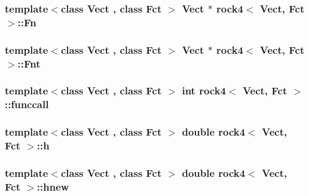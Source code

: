 \hypertarget{classrock4_a98e77f7c93220f078b4a7b4e7f861cc0}{
\subsubsection[{Fn}]{\setlength{\rightskip}{0pt plus 5cm}template$<$class Vect , class Fct $>$ Vect $\ast$ {\bf rock4}$<$ Vect, Fct $>$\-::Fn\hspace{0.3cm}{\ttfamily [private]}}}\label{classrock4_a98e77f7c93220f078b4a7b4e7f861cc0}
\hypertarget{classrock4_ac350c132515ab318ab0478b00321febe}{
\subsubsection[{Fnt}]{\setlength{\rightskip}{0pt plus 5cm}template$<$class Vect , class Fct $>$ Vect $\ast$ {\bf rock4}$<$ Vect, Fct $>$\-::Fnt\hspace{0.3cm}{\ttfamily [private]}}}\label{classrock4_ac350c132515ab318ab0478b00321febe}
\hypertarget{classrock4_a8f6165ff91a4e3fe6722cfe60231f968}{
\subsubsection[{funccall}]{\setlength{\rightskip}{0pt plus 5cm}template$<$class Vect , class Fct $>$ int {\bf rock4}$<$ Vect, Fct $>$\-::funccall\hspace{0.3cm}{\ttfamily [private]}}}\label{classrock4_a8f6165ff91a4e3fe6722cfe60231f968}
\hypertarget{classrock4_a6f524670ac0a00ad38e3cbdef112b849}{
\subsubsection[{h}]{\setlength{\rightskip}{0pt plus 5cm}template$<$class Vect , class Fct $>$ double {\bf rock4}$<$ Vect, Fct $>$\-::h\hspace{0.3cm}{\ttfamily [private]}}}\label{classrock4_a6f524670ac0a00ad38e3cbdef112b849}
\hypertarget{classrock4_a2cb273ca88d7568a5bc7a6cf5c988564}{
\subsubsection[{hnew}]{\setlength{\rightskip}{0pt plus 5cm}template$<$class Vect , class Fct $>$ double {\bf rock4}$<$ Vect, Fct $>$\-::hnew\hspace{0.3cm}{\ttfamily [private]}}}\label{classrock4_a2cb273ca88d7568a5bc7a6cf5c988564}
